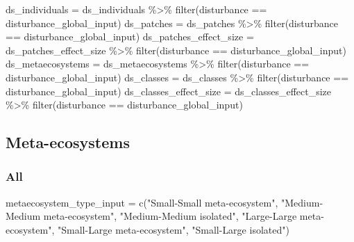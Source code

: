 \documentclass[
]{article}
\newenvironment{Shaded}{\begin{snugshade}}{\end{snugshade}}
\newcommand{\FunctionTok}[1]{\textcolor[rgb]{0.00,0.00,0.00}{#1}}
\newcommand{\NormalTok}[1]{#1}
\newcommand{\OtherTok}[1]{\textcolor[rgb]{0.56,0.35,0.01}{#1}}
\newcommand{\SpecialCharTok}[1]{\textcolor[rgb]{0.00,0.00,0.00}{#1}}
\newcommand{\StringTok}[1]{\textcolor[rgb]{0.31,0.60,0.02}{#1}}
\begin{document}
\begin{Shaded}
\begin{Highlighting}[]
\NormalTok{ds\_individuals }\OtherTok{=}\NormalTok{ ds\_individuals }\SpecialCharTok{\%\textgreater{}\%}
  \FunctionTok{filter}\NormalTok{(disturbance }\SpecialCharTok{==}\NormalTok{ disturbance\_global\_input)}
\NormalTok{ds\_patches }\OtherTok{=}\NormalTok{ ds\_patches }\SpecialCharTok{\%\textgreater{}\%}
  \FunctionTok{filter}\NormalTok{(disturbance }\SpecialCharTok{==}\NormalTok{ disturbance\_global\_input)}
\NormalTok{ds\_patches\_effect\_size }\OtherTok{=}\NormalTok{ ds\_patches\_effect\_size }\SpecialCharTok{\%\textgreater{}\%}
  \FunctionTok{filter}\NormalTok{(disturbance }\SpecialCharTok{==}\NormalTok{ disturbance\_global\_input)}
\NormalTok{ds\_metaecosystems }\OtherTok{=}\NormalTok{ ds\_metaecosystems }\SpecialCharTok{\%\textgreater{}\%}
  \FunctionTok{filter}\NormalTok{(disturbance }\SpecialCharTok{==}\NormalTok{ disturbance\_global\_input)}
\NormalTok{ds\_classes }\OtherTok{=}\NormalTok{ ds\_classes }\SpecialCharTok{\%\textgreater{}\%}
  \FunctionTok{filter}\NormalTok{(disturbance }\SpecialCharTok{==}\NormalTok{ disturbance\_global\_input)}
\NormalTok{ds\_classes\_effect\_size }\OtherTok{=}\NormalTok{ ds\_classes\_effect\_size }\SpecialCharTok{\%\textgreater{}\%}
  \FunctionTok{filter}\NormalTok{(disturbance }\SpecialCharTok{==}\NormalTok{ disturbance\_global\_input)}
\end{Highlighting}
\end{Shaded}

\hypertarget{meta-ecosystems}{%
\subsection{Meta-ecosystems}\label{meta-ecosystems}}

\hypertarget{all}{%
\subsubsection{All}\label{all}}

\begin{Shaded}
\begin{Highlighting}[]
\NormalTok{metaecosystem\_type\_input }\OtherTok{=} \FunctionTok{c}\NormalTok{(}\StringTok{"Small{-}Small meta{-}ecosystem"}\NormalTok{,}
                             \StringTok{"Medium{-}Medium meta{-}ecosystem"}\NormalTok{,}
                             \StringTok{"Medium{-}Medium isolated"}\NormalTok{,}
                             \StringTok{"Large{-}Large meta{-}ecosystem"}\NormalTok{,}
                             \StringTok{"Small{-}Large meta{-}ecosystem"}\NormalTok{,}
                             \StringTok{"Small{-}Large isolated"}\NormalTok{)}
\end{Highlighting}
\end{Shaded}
\end{document}

